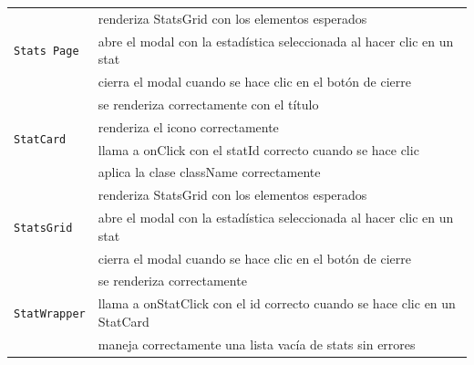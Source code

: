 \begin{longtable}{|p{5cm}|p{9cm}|}
    \multirow{3}{*}{\texttt{Stats Page}}            & renderiza StatsGrid con los elementos esperados                              \\ \cline{2-2}
                                                    & abre el modal con la estadística seleccionada al hacer clic en un stat       \\ \cline{2-2}
                                                    & cierra el modal cuando se hace clic en el botón de cierre                    \\ \hline

    \multirow{4}{*}{\texttt{StatCard}}              & se renderiza correctamente con el título                                     \\ \cline{2-2}
                                                    & renderiza el icono correctamente                                             \\ \cline{2-2}
                                                    & llama a onClick con el statId correcto cuando se hace clic                   \\ \cline{2-2}
                                                    & aplica la clase className correctamente                                      \\ \hline

    \multirow{3}{*}{\texttt{StatsGrid}}             & renderiza StatsGrid con los elementos esperados                              \\ \cline{2-2}
                                                    & abre el modal con la estadística seleccionada al hacer clic en un stat       \\ \cline{2-2}
                                                    & cierra el modal cuando se hace clic en el botón de cierre                    \\ \hline

    \multirow{3}{*}{\texttt{StatWrapper}}           & se renderiza correctamente                                                   \\ \cline{2-2}
                                                    & llama a onStatClick con el id correcto cuando se hace clic en un StatCard    \\ \cline{2-2}
                                                    & maneja correctamente una lista vacía de stats sin errores                    \\ \hline


\end{longtable}
